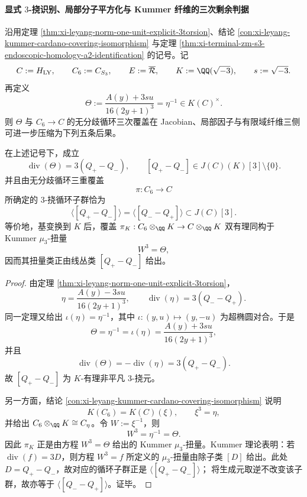 \paragraph{显式 \(3\)-挠识别、局部分子平方化与 Kummer 纤维的三次剩余判据}
沿用定理 \ref{thm:xi-leyang-norm-one-unit-explicit-3torsion}、结论 \ref{con:xi-leyang-kummer-cardano-covering-isomorphism} 与定理 \ref{thm:xi-terminal-zm-s3-endoscopic-homology-a2-identification} 的记号。记
\[
C:=H_{\mathrm{LY}},
\qquad
C_6:=C_{S_3},
\qquad
E:=\overline{\mathcal R},
\qquad
K:=\QQ(\sqrt{-3}),
\qquad
s:=\sqrt{-3}.
\]
再定义
\[
\Theta:=\frac{A(y)+3su}{16(2y+1)^3}=\eta^{-1}\in K(C)^\times.
\]
则 \(\Theta\) 与 \(C_6\to C\) 的无分歧循环三次覆盖在 Jacobian、局部因子与有限域纤维三侧可进一步压缩为下列五条后果。

\begin{theorem}[显式 \(3\)-挠子群与无分歧三重扭量的同一性]\label{thm:xi-leyang-explicit-3torsor-generator-identification}
在上述记号下，成立
\[
\operatorname{div}(\Theta)=3(Q_+-Q_-),
\qquad
[Q_+-Q_-]\in J(C)(K)[3]\setminus\{0\}.
\]
并且由无分歧循环三重覆盖
\[
\pi:C_6\longrightarrow C
\]
所确定的 \(3\)-挠循环子群恰为
\[
\boxed{\;
\langle[Q_+-Q_-]\rangle
=
\langle[Q_--Q_+]\rangle
\subset J(C)[3].\;}
\]
等价地，基变换到 \(K\) 后，覆盖 \(\pi_K:C_6\otimes_{\QQ}K\to C\otimes_{\QQ}K\) 双有理同构于 Kummer \(\mu_3\)-扭量
\[
W^3=\Theta,
\]
因而其扭量类正由线丛类 \([Q_+-Q_-]\) 给出。
\end{theorem}
\begin{proof}
由定理 \ref{thm:xi-leyang-norm-one-unit-explicit-3torsion}，
\[
\eta=\frac{A(y)-3su}{16(2y+1)^3},
\qquad
\operatorname{div}(\eta)=3(Q_--Q_+).
\]
同一定理又给出 \(\iota(\eta)=\eta^{-1}\)，其中 \(\iota:(y,u)\mapsto(y,-u)\) 为超椭圆对合。于是
\[
\Theta=\eta^{-1}=\iota(\eta)=\frac{A(y)+3su}{16(2y+1)^3},
\]
并且
\[
\operatorname{div}(\Theta)=-\operatorname{div}(\eta)=3(Q_+-Q_-).
\]
故 \([Q_+-Q_-]\) 为 \(K\)-有理非平凡 \(3\)-挠元。

另一方面，结论 \ref{con:xi-leyang-kummer-cardano-covering-isomorphism} 说明
\[
K(C_6)=K(C)(\xi),
\qquad
\xi^3=\eta,
\]
并给出 \(C_6\otimes_{\QQ}K\cong C_\eta\)。令 \(W:=\xi^{-1}\)，则
\[
W^3=\eta^{-1}=\Theta.
\]
因此 \(\pi_K\) 正是由方程 \(W^3=\Theta\) 给出的 Kummer \(\mu_3\)-扭量。Kummer 理论表明：若 \(\operatorname{div}(f)=3D\)，则方程 \(W^3=f\) 所定义的 \(\mu_3\)-扭量由除子类 \([D]\) 给出。此处 \(D=Q_+-Q_-\)，故对应的循环子群正是
\(
\langle[Q_+-Q_-]\rangle
\)；
将生成元取逆不改变该子群，故亦等于 \(\langle[Q_--Q_+]\rangle\)。证毕。
\end{proof}

